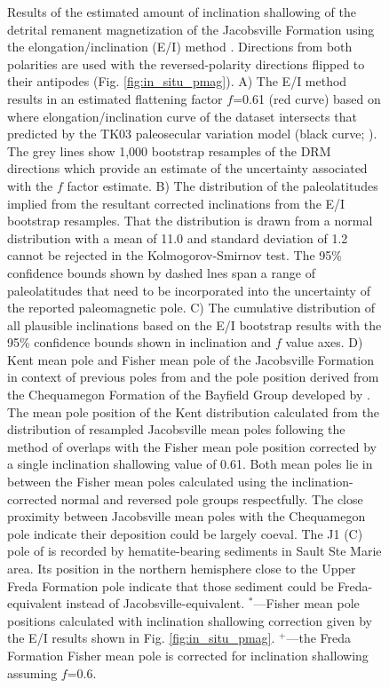 \documentclass[draft]{agujournal2019}
\begin{document}
\begin{figure}[H!]
\caption{\footnotesize Results of the estimated amount of inclination shallowing of the detrital remanent magnetization of the Jacobsville Formation using the elongation/inclination (E/I) method \cite{Tauxe2004b}. Directions from both polarities are used with the reversed-polarity directions flipped to their antipodes (Fig. \ref{fig:in_situ_pmag}). A) The E/I method results in an estimated flattening factor $f$=0.61 (red curve) based on where elongation/inclination curve of the dataset intersects that predicted by the TK03 paleosecular variation model (black curve; ). The grey lines show 1,000 bootstrap resamples of the DRM directions which provide an estimate of the uncertainty associated with the $f$ factor estimate. B) The distribution of the paleolatitudes implied from the resultant corrected inclinations from the E/I bootstrap resamples. That the distribution is drawn from a normal distribution with a mean of 11.0 and standard deviation of 1.2 cannot be rejected in the Kolmogorov-Smirnov test. The 95\% confidence bounds shown by dashed lnes span a range of paleolatitudes that need to be incorporated into the uncertainty of the reported paleomagnetic pole. C) The cumulative distribution of all plausible inclinations based on the E/I bootstrap results with the 95\% confidence bounds shown in inclination and $f$ value axes. D) Kent mean pole and Fisher mean pole of the Jacobsville Formation in context of previous poles from  and the pole position derived from the Chequamegon Formation of the Bayfield Group developed by . The mean pole position of the Kent distribution calculated from the distribution of resampled Jacobsville mean poles following the method of  overlaps with the Fisher mean pole position corrected by a single inclination shallowing value of 0.61. Both mean poles lie in between the Fisher mean poles calculated using the inclination-corrected normal and reversed pole groups respectfully. The close proximity between Jacobsville mean poles with the Chequamegon pole indicate their deposition could be largely coeval. The J1 (C) pole of  is recorded by hematite-bearing sediments in Sault Ste Marie area. Its position in the northern hemisphere close to the Upper Freda Formation pole indicate that those sediment could be Freda-equivalent instead of Jacobsville-equivalent. $^*$---Fisher mean pole positions calculated with inclination shallowing correction given by the E/I results shown in Fig. \ref{fig:in_situ_pmag}. $^+$---the Freda Formation Fisher mean pole is corrected for inclination shallowing assuming $f$=0.6. }
\label{fig:EI_results}
\end{figure}
\end{document}
